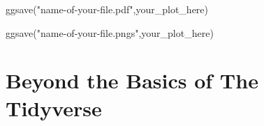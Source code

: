 \documentclass[
  letterpaper,
  DIV=11,
  numbers=noendperiod,
  oneside]{scrreprt}
\newenvironment{Shaded}{\begin{snugshade}}{\end{snugshade}}
\newcommand{\FunctionTok}[1]{\textcolor[rgb]{0.28,0.35,0.67}{#1}}
\newcommand{\NormalTok}[1]{\textcolor[rgb]{0.00,0.23,0.31}{#1}}
\newcommand{\StringTok}[1]{\textcolor[rgb]{0.13,0.47,0.30}{#1}}
\begin{document}
\begin{Shaded}
\begin{Highlighting}[]
\FunctionTok{ggsave}\NormalTok{(}\StringTok{"name{-}of{-}your{-}file.pdf"}\NormalTok{,your\_plot\_here) }
\end{Highlighting}
\end{Shaded}

\begin{Shaded}
\begin{Highlighting}[]
\FunctionTok{ggsave}\NormalTok{(}\StringTok{"name{-}of{-}your{-}file.pngs"}\NormalTok{,your\_plot\_here)}
\end{Highlighting}
\end{Shaded}

\part{Beyond the Basics of The Tidyverse}
\end{document}
